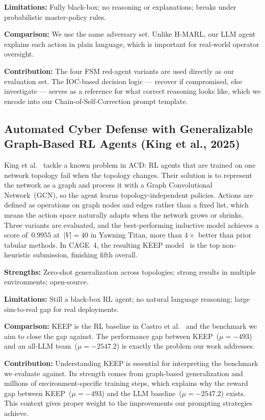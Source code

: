 \documentclass[letterpaper, 10 pt, conference]{ieeeconf}
\begin{document}
\textbf{Limitations:} Fully black-box; no reasoning or
explanations; breaks under probabilistic master-policy rules.
 
\textbf{Comparison:} We use the same adversary set. Unlike
H-MARL, our LLM agent explains each action in plain language,
which is important for real-world operator oversight.
 
\textbf{Contribution:} The four FSM red-agent variants are used
directly as our evaluation set. The IOC-based decision logic
--- recover if compromised, else investigate --- serves as a
reference for what correct reasoning looks like, which we
encode into our Chain-of-Self-Correction prompt template.
 
\subsection{\textbf{Automated Cyber Defense with Generalizable
            Graph-Based RL Agents (King et al., 2025)}}
 
King et al.~\cite{arXiv:2509.16151} tackle a known problem in
ACD: RL agents that are trained on one network topology fail
when the topology changes. Their solution is to represent the
network as a graph and process it with a Graph Convolutional
Network~(GCN), so the agent learns topology-independent
policies. Actions are defined as operations on graph nodes and
edges rather than a fixed list, which means the action space
naturally adapts when the network grows or shrinks. Three
variants are evaluated, and the best-performing inductive model
achieves a score of~$0.9955$ at~$|V|=40$ in Yawning Titan,
more than $4\times$ better than prior tabular methods. In
CAGE~4, the resulting KEEP model~\cite{KEEP:2025} is the
top non-heuristic submission, finishing fifth overall.
 
\textbf{Strengths:} Zero-shot generalization across topologies;
strong results in multiple environments; open-source.
 
\textbf{Limitations:} Still a black-box RL agent; no natural
language reasoning; large sim-to-real gap for real deployments.
 
\textbf{Comparison:} KEEP is the RL baseline in
Castro et al.~\cite{arXiv:2505.04843v2} and the benchmark we
aim to close the gap against. The performance gap between
KEEP~($\mu = -493$) and an all-LLM team~($\mu = -2547.2$)
is exactly the problem our work addresses.
 
\textbf{Contribution:} Understanding KEEP is essential for
interpreting the benchmark we evaluate against. Its strength
comes from graph-based generalization and millions of
environment-specific training steps, which explains why the
reward gap between KEEP~($\mu = -493$) and the LLM
baseline~($\mu = -2547.2$) exists. This context gives proper
weight to the improvements our prompting strategies achieve.
 
\end{document}
